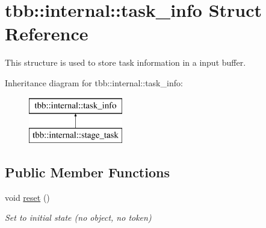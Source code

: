\hypertarget{structtbb_1_1internal_1_1task__info}{}\section{tbb\+:\+:internal\+:\+:task\+\_\+info Struct Reference}
\label{structtbb_1_1internal_1_1task__info}


This structure is used to store task information in a input buffer.  


Inheritance diagram for tbb\+:\+:internal\+:\+:task\+\_\+info\+:\begin{figure}[H]
\begin{center}
\leavevmode
\includegraphics[height=2.000000cm]{structtbb_1_1internal_1_1task__info}
\end{center}
\end{figure}
\subsection*{Public Member Functions}
\begin{DoxyCompactItemize}
\item 
\hypertarget{structtbb_1_1internal_1_1task__info_ab3f3113f09c5c37a656a3ed027f0f239}{}void \hyperlink{structtbb_1_1internal_1_1task__info_ab3f3113f09c5c37a656a3ed027f0f239}{reset} ()\label{structtbb_1_1internal_1_1task__info_ab3f3113f09c5c37a656a3ed027f0f239}

\begin{DoxyCompactList}\small\item\em Set to initial state (no object, no token) \end{DoxyCompactList}\end{DoxyCompactItemize}
